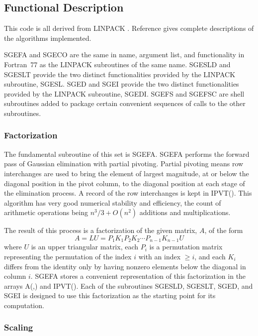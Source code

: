 \documentclass[twoside]{MATH77}
\begin{document}
\subsection{Functional Description}

This code is all derived from LINPACK \cite{Dongarra:1979:LUG}.  Reference
\cite{Dongarra:1979:LUG} gives complete descriptions of the algorithms
implemented.

SGEFA and SGECO are the same in name, argument list, and functionality in
Fortran~77 as the LINPACK subroutines of the same name. SGESLD and SGESLT
provide the two distinct functionalities provided by the LINPACK subroutine,
SGESL. SGED and SGEI provide the two distinct functionalities provided by
the LINPACK subroutine, SGEDI. SGEFS and SGEFSC are shell subroutines added
to package certain convenient sequences of calls to the other subroutines.

\subsubsection{Factorization}

The fundamental subroutine of this set is SGEFA. SGEFA performs the forward
pass of Gaussian elimination with partial pivoting. Partial pivoting means
row interchanges are used to bring the element of largest magnitude, at or
below the diagonal position in the pivot column, to the diagonal position at
each stage of the elimination process. A record of the row interchanges is
kept in IPVT(). This algorithm has very good numerical stability and
efficiency, the count of arithmetic operations being $n^3/3 + O(n^2)$
additions and multiplications.

The result of this process is a factorization of the given matrix, $A$, of the
form
\begin{equation*}
A = LU = P_1K_1P_2K_2 \cdots P_{n-1}K_{n-1}U
\end{equation*}
where $U$ is an upper triangular matrix, each $P_i$ is a permutation matrix
representing the permutation of the index $i$ with an index $\geq i$, and
each $K_i$ differs from the identity only by having nonzero elements below
the diagonal in column $i$. SGEFA stores a convenient representation of this
factorization in the arrays A(,) and IPVT(). Each of the subroutines SGESLD,
SGESLT, SGED, and SGEI is designed to use this factorization as the starting
point for its computation.

\subsubsection{Scaling}
\end{document}
